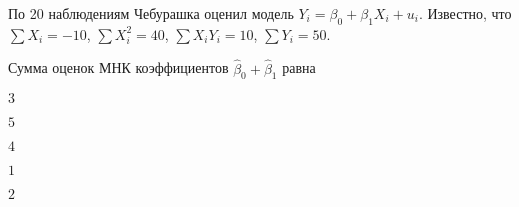 
\begin{question}
По 20 наблюдениям Чебурашка оценил модель \(Y_i = \beta_0 + \beta_1 X_i + u_i\).
Известно, что \(\sum X_i = -10\), \(\sum X_i^2 = 40\), \(\sum X_i Y_i = 10\), \(\sum Y_i = 50\).

Сумма оценок МНК коэффициентов \(\hat \beta_0 + \hat \beta_1\) равна
\begin{answerlist}
  \item \(3\)
  \item \(5\)
  \item \(4\)
  \item \(1\)
  \item \(2\)
\end{answerlist}
\end{question}


